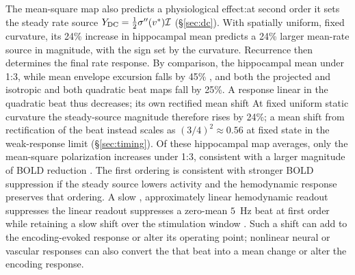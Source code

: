 \documentclass[11pt,a4paper]{article}
\newcommand{\Sig}{\sigma}
\providecommand{\DIFaddtex}[1]{{\protect\color{blue} \sf #1}} %
\providecommand{\DIFdeltex}[1]{{\protect\color{red} \scriptsize #1}} %
\providecommand{\DIFaddbegin}{} %
\providecommand{\DIFaddend}{} %
\providecommand{\DIFdelbegin}{} %
\providecommand{\DIFdelend}{} %
\providecommand{\DIFadd}[1]{\texorpdfstring{\DIFaddtex{#1}}{#1}} %
\providecommand{\DIFdel}[1]{\texorpdfstring{\DIFdeltex{#1}}{}} %
\begin{document}
\DIFdel{The mean-square map also predicts a physiological effect:at second order it
sets the steady rate source $Y_{\rm DC}=\tfrac12\Sig''(v^*)\mathcal I$
(\S\ref{sec:dc}). With spatially uniform, fixed curvature, its 24\% increase
in hippocampal mean
predicts a 24\% larger mean-rate source in magnitude,
with the sign set by the curvature. Recurrence then determines the final rate
response. By comparison, the hippocampal mean }\DIFdelend \DIFaddbegin \DIFadd{under 1:3, while mean
}\DIFaddend envelope excursion falls by 45\% \DIFdelbegin \DIFdel{, and both the projected and isotropic }\DIFdelend \DIFaddbegin \DIFadd{and both }\DIFaddend quadratic beat maps fall by 25\%.
\DIFdelbegin \DIFdel{A response linear in the quadratic beat thus decreases; its own rectified
mean shift }\DIFdelend \DIFaddbegin \DIFadd{At fixed uniform static curvature the steady-source magnitude therefore rises
by 24\%; a mean shift from rectification of the beat instead }\DIFaddend scales as
$(3/4)^2\approx0.56$ \DIFdelbegin \DIFdel{at fixed state }\DIFdelend in the weak-response limit\DIFdelbegin \DIFdel{(\S\ref{sec:timing}). Of these hippocampal map averages, only the
mean-square polarization increases under 1:3, consistent with a larger
magnitude of BOLD reduction }\DIFdelend \DIFaddbegin \DIFadd{. The first ordering is
consistent with stronger BOLD suppression }\DIFaddend if the steady source lowers activity
and the hemodynamic response preserves that ordering. A slow \DIFdelbegin \DIFdel{, approximately linear hemodynamic readout
suppresses the }\DIFdelend \DIFaddbegin \DIFadd{linear readout
suppresses a }\DIFaddend zero-mean $5$~Hz beat \DIFdelbegin \DIFdel{at first order }\DIFdelend while retaining a \DIFdelbegin \DIFdel{slow }\DIFdelend shift over the stimulation
window\DIFdelbegin \DIFdel{. Such a shift can add to
the encoding-evoked response or alter its operating point}\DIFdelend ; nonlinear neural or vascular responses can also convert \DIFdelbegin \DIFdel{the }\DIFdelend \DIFaddbegin \DIFadd{that }\DIFaddend beat into
a mean change \DIFaddbegin \DIFadd{or alter the encoding response}\DIFaddend .
\end{document}
